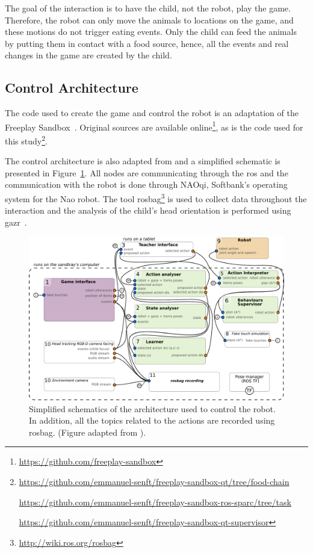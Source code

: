 The goal of the interaction is to have the child, not the robot, play the game. Therefore, the robot can only move the animals to locations on the game, and these motions do not trigger eating events. Only the child can feed the animals by putting them in contact with a food source, hence, all the events and real changes in the game are created by the child. 
\subsection{Control Architecture}\label{sec:tuto_arch}

The code used to create the game and control the robot is an adaptation of the Freeplay Sandbox~\citep{lemaignan2017free}. Original sources are available online\footnote{\url{https://github.com/freeplay-sandbox}}, as is the code used for this study\footnote{\url{https://github.com/emmanuel-senft/freeplay-sandbox-qt/tree/food-chain}
	
\url{https://github.com/emmanuel-senft/freeplay-sandbox-ros-sparc/tree/task}
	
\url{https://github.com/emmanuel-senft/freeplay-sandbox-qt-supervisor}}.

The control architecture is also adapted from \cite{lemaignan2017free} and a simplified schematic is presented in Figure~\ref{fig:tutoring_arch}. All nodes are communicating through the \gls{ros} \citep{quigley2009ros} and the communication with the robot is done through NAOqi, Softbank's operating system for the Nao robot. The tool rosbag\footnote{\url{http://wiki.ros.org/rosbag}} is used to collect data throughout the interaction and the analysis of the child's head orientation is performed using gazr~\citep{lemaignan2016real}.

\begin{figure}[ht]
	\centering
	\includegraphics[width=1\textwidth]{architecture.pdf}
	\caption{Simplified schematics of the architecture used to control the robot. In addition, all the topics related to the actions are recorded using rosbag. (Figure adapted from \citealt{lemaignan2017free}).}
	\label{fig:tutoring_arch}
\end{figure}

